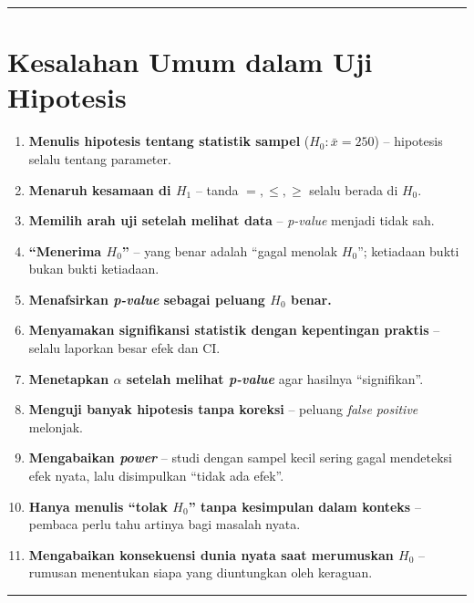\documentclass[
  indonesian,
  letterpaper,
]{book}
\providecommand{\tightlist}{%
  \setlength{\itemsep}{0pt}\setlength{\parskip}{0pt}}
\begin{document}
\begin{center}\rule{0.5\linewidth}{0.5pt}\end{center}


\chapter{Kesalahan Umum dalam Uji
Hipotesis}\label{kesalahan-umum-dalam-uji-hipotesis}

\begin{enumerate}
\def\labelenumi{\arabic{enumi}.}
\tightlist
\item
  \textbf{Menulis hipotesis tentang statistik sampel}
  (\(H_0 : \bar{x} = 250\)) -- hipotesis selalu tentang parameter.
\item
  \textbf{Menaruh kesamaan di \(H_1\)} -- tanda \(=, \leq, \geq\) selalu
  berada di \(H_0\).
\item
  \textbf{Memilih arah uji setelah melihat data} -- \emph{p-value}
  menjadi tidak sah.
\item
  \textbf{``Menerima \(H_0\)''} -- yang benar adalah ``gagal menolak
  \(H_0\)''; ketiadaan bukti bukan bukti ketiadaan.
\item
  \textbf{Menafsirkan \emph{p-value} sebagai peluang \(H_0\) benar.}
\item
  \textbf{Menyamakan signifikansi statistik dengan kepentingan praktis}
  -- selalu laporkan besar efek dan CI.
\item
  \textbf{Menetapkan \(\alpha\) setelah melihat \emph{p-value}} agar
  hasilnya ``signifikan''.
\item
  \textbf{Menguji banyak hipotesis tanpa koreksi} -- peluang \emph{false
  positive} melonjak.
\item
  \textbf{Mengabaikan \emph{power}} -- studi dengan sampel kecil sering
  gagal mendeteksi efek nyata, lalu disimpulkan ``tidak ada efek''.
\item
  \textbf{Hanya menulis ``tolak \(H_0\)'' tanpa kesimpulan dalam
  konteks} -- pembaca perlu tahu artinya bagi masalah nyata.
\item
  \textbf{Mengabaikan konsekuensi dunia nyata saat merumuskan \(H_0\)}
  -- rumusan menentukan siapa yang diuntungkan oleh keraguan.
\end{enumerate}

\begin{center}\rule{0.5\linewidth}{0.5pt}\end{center}
\end{document}
